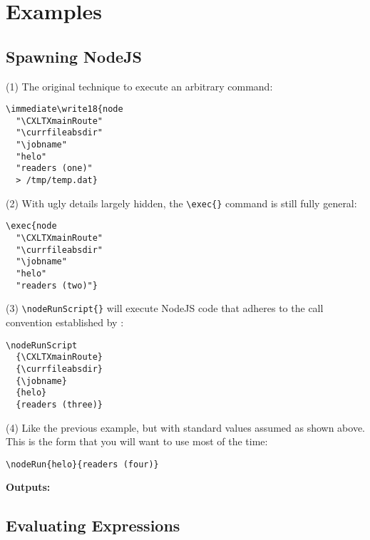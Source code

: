 

\section{Examples}\label{examples}

\subsection{Spawning NodeJS}\label{spawningnodejs}

(1) The original technique to execute an arbitrary command:
\begin{verbatim}
\immediate\write18{node
  "\CXLTXmainRoute"
  "\currfileabsdir"
  "\jobname"
  "helo"
  "readers (one)"
  > /tmp/temp.dat}
\end{verbatim}

(2) With ugly details largely hidden, the \verb#\exec{}# command is still fully general:
\begin{verbatim}
\exec{node
  "\CXLTXmainRoute"
  "\currfileabsdir"
  "\jobname"
  "helo"
  "readers (two)"}
\end{verbatim}

(3) \verb#\nodeRunScript{}# will execute NodeJS code that adheres to the call convention established by
\CXLTX:
\begin{verbatim}
\nodeRunScript
  {\CXLTXmainRoute}
  {\currfileabsdir}
  {\jobname}
  {helo}
  {readers (three)}
\end{verbatim}

(4) Like the previous example, but with standard values assumed as shown above. This is the form that you
will want to use most of the time:
\begin{verbatim}
\nodeRun{helo}{readers (four)}
\end{verbatim}


{\textbf{Outputs:}}

\immediate{}





\subsection{Evaluating Expressions}\label{evalcs}

